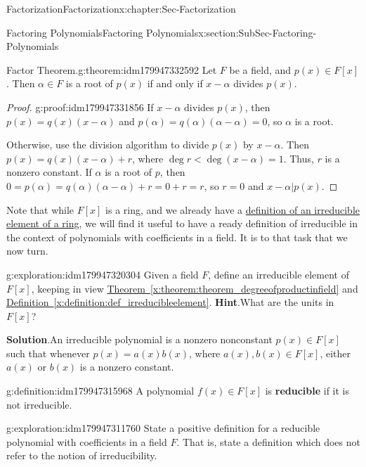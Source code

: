 \documentclass[oneside,10pt,]{book}
\newcommand{\blocktitlefont}{\relax}
\newcommand{\xreffont}{\relax}
\newcommand{\terminology}[1]{\textbf{#1}}
\numberwithin{equation}{section}
\newcommand{\lt}{<}
\begin{document}
\begin{chapterptx}{Factorization}{}{Factorization}{}{}{x:chapter:Sec-Factorization}
\begin{sectionptx}{Factoring Polynomials}{}{Factoring Polynomials}{}{}{x:section:SubSec-Factoring-Polynomials}
\begin{theorem}{Factor Theorem.}{}{g:theorem:idm179947332592}%
Let \(F\) be a field, and \(p(x)\in F[x]\). Then \(\alpha\in F\) is a root of \(p(x)\) if and only if \(x-\alpha\) divides \(p(x)\).%
\end{theorem}
\begin{proof}{}{g:proof:idm179947331856}
If \(x-\alpha\) divides \(p(x)\), then \(p(x) = q(x) (x-\alpha)\) and \(p(\alpha) = q(\alpha) (\alpha - \alpha) = 0\), so \(\alpha\) is a root.%
\par
Otherwise, use the division algorithm to divide \(p(x)\) by \(x-\alpha\). Then \(p(x) = q(x)(x-\alpha) + r\), where \(\deg r \lt \deg (x-\alpha) = 1\). Thus, \(r\) is a nonzero constant. If \(\alpha\) is a root of \(p\), then \(0 = p(\alpha) = q(\alpha) (\alpha - \alpha) + r = 0 + r = r\), so \(r=0\) and \(x-\alpha | p(x)\).%
\end{proof}
Note that while \(F[x]\) is a ring, and we already have a \hyperref[x:definition:def_irreducibleelement]{definition of an irreducible element of a ring}, we will find it useful to have a ready definition of irreducible in the context of polynomials with coefficients in a field. It is to that task that we now turn.%
\begin{exploration}{}{g:exploration:idm179947320304}%
Given a field \(F\), define an irreducible element of \(F[x]\), keeping in view \hyperref[x:theorem:theorem_degreeofproductinfield]{Theorem~{\xreffont\ref{x:theorem:theorem_degreeofproductinfield}}} and \hyperref[x:definition:def_irreducibleelement]{Definition~{\xreffont\ref{x:definition:def_irreducibleelement}}}. \textbf{\blocktitlefont Hint}.\quad{}What are the units in \(F[x]\)?%
\par\smallskip%
\noindent\textbf{\blocktitlefont Solution}.\hypertarget{g:solution:idm179947319568}{}\quad{}An irreducible polynomial is a nonzero nonconstant \(p(x)\in F[x]\) such that whenever \(p(x) = a(x) b(x)\), where \(a(x), b(x) \in F[x]\), either \(a(x)\) or \(b(x)\) is a nonzero constant.%
\end{exploration}
\begin{definition}{}{g:definition:idm179947315968}%
%
A polynomial \(f(x)\in F[x]\) is \terminology{reducible} if it is not irreducible.%
\end{definition}
\begin{exploration}{}{g:exploration:idm179947311760}%
State a positive definition for a reducible polynomial with coefficients in a field \(F\). That is, state a definition which does not refer to the notion of irreducibility.%

\end{exploration}
\end{sectionptx}
\end{chapterptx}
\end{document}
